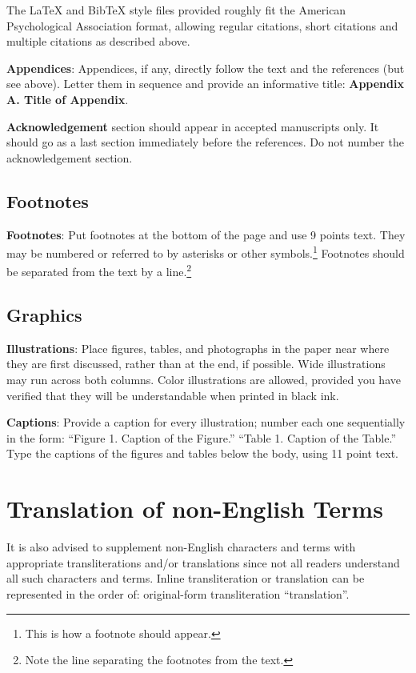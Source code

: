 \documentclass[11pt]{article}
\begin{document}
The \LaTeX{} and Bib\TeX{} style files provided roughly fit the
American Psychological Association format, allowing regular citations, 
short citations and multiple citations as described above.

{\bf Appendices}: Appendices, if any, directly follow the text and the
references (but see above).  Letter them in sequence and provide an
informative title: {\bf Appendix A. Title of Appendix}.

\textbf{Acknowledgement} section should appear in accepted manuscripts
only. It should go as a last section immediately
before the references.  Do not number the acknowledgement section.

\subsection{Footnotes}

{\bf Footnotes}: Put footnotes at the bottom of the page and use 9
points text. They may be numbered or referred to by asterisks or other
symbols.\footnote{This is how a footnote should appear.} Footnotes
should be separated from the text by a line.\footnote{Note the line
separating the footnotes from the text.}

\subsection{Graphics}

{\bf Illustrations}: Place figures, tables, and photographs in the
paper near where they are first discussed, rather than at the end, if
possible.  Wide illustrations may run across both columns.  Color
illustrations are allowed, provided you have verified that  
they will be understandable when printed in black ink.

{\bf Captions}: Provide a caption for every illustration; number each one
sequentially in the form:  ``Figure 1. Caption of the Figure.'' ``Table 1.
Caption of the Table.''  Type the captions of the figures and 
tables below the body, using 11 point text.  

\section{Translation of non-English Terms}

It is also advised to supplement non-English characters and terms
with appropriate transliterations and/or translations
since not all readers understand all such characters and terms.
Inline transliteration or translation can be represented in
the order of: original-form transliteration ``translation''.
\end{document}
